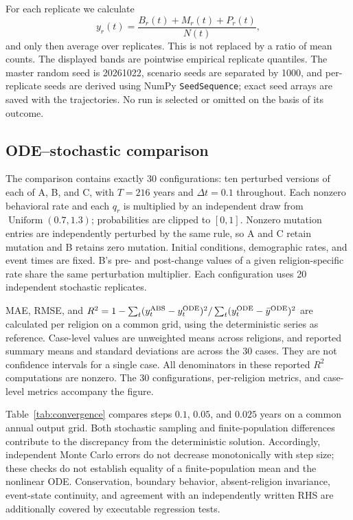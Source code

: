 For each replicate we calculate
\begin{equation}
y_r(t)=\frac{B_r(t)+M_r(t)+P_r(t)}{N(t)},
\label{eq:total-share}
\end{equation}
and only then average over replicates. This is not replaced by a ratio of mean counts. The displayed bands are pointwise empirical replicate quantiles. The master random seed is 20261022, scenario seeds are separated by 1000, and per-replicate seeds are derived using NumPy \texttt{SeedSequence}; exact seed arrays are saved with the trajectories. No run is selected or omitted on the basis of its outcome.

\subsection{ODE--stochastic comparison}
The comparison contains exactly 30 configurations: ten perturbed versions of each of A, B, and C, with $T=216$ years and $\Delta t=0.1$ throughout. Each nonzero behavioral rate and each $q_r$ is multiplied by an independent draw from $\operatorname{Uniform}(0.7,1.3)$; probabilities are clipped to $[0,1]$. Nonzero mutation entries are independently perturbed by the same rule, so A and C retain mutation and B retains zero mutation. Initial conditions, demographic rates, and event times are fixed. B's pre- and post-change values of a given religion-specific rate share the same perturbation multiplier. Each configuration uses 20 independent stochastic replicates.

MAE, RMSE, and $R^2=1-\sum_t(y^{\rm ABS}_t-y^{\rm ODE}_t)^2/\sum_t(y^{\rm ODE}_t-\bar y^{\rm ODE})^2$ are calculated per religion on a common grid, using the deterministic series as reference. Case-level values are unweighted means across religions, and reported summary means and standard deviations are across the 30 cases. They are not confidence intervals for a single case. All denominators in these reported $R^2$ computations are nonzero. The 30 configurations, per-religion metrics, and case-level metrics accompany the figure.

Table~\ref{tab:convergence} compares steps $0.1$, $0.05$, and $0.025$ years on a common annual output grid. Both stochastic sampling and finite-population differences contribute to the discrepancy from the deterministic solution. Accordingly, independent Monte Carlo errors do not decrease monotonically with step size; these checks do not establish equality of a finite-population mean and the nonlinear ODE. Conservation, boundary behavior, absent-religion invariance, event-state continuity, and agreement with an independently written RHS are additionally covered by executable regression tests.


